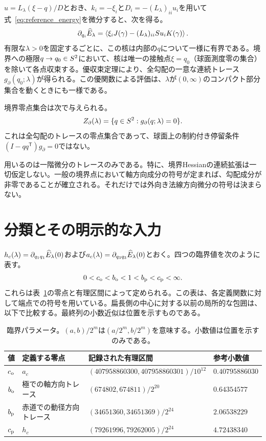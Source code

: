 $u=L_\lambda(\xi-q)/D$とおき、$k_i=-\xi_i$と$D_i=-(L_\lambda)_{ii}u_i$を用いて式~\eqref{eq:reference_energy}を微分すると、次を得る。
\begin{equation}\label{eq:gradient}
 \partial_{q_i}\widehat E_\lambda
 =\left\langle \xi_iJ(\gamma)-(L_\lambda)_{ii}S u_iK(\gamma)\right\rangle.
\end{equation}
有限な$\lambda>0$を固定するごとに、この核は内部の$q$について一様に有界である。境界への極限$q\to q_0\in S^2$において、核は唯一の接触点$\xi=q_0$（球面測度零の集合）を除いて各点収束する。優収束定理により、全勾配の一意な連続トレース$g_\partial(q_0;\lambda)$が得られる。この優関数による評価は、$\lambda$が$(0,\infty)$のコンパクト部分集合を動くときにも一様である。

\begin{definition}[境界零点の規約]\label{def:boundary}
境界零点集合は次で与えられる。
\begin{equation}\label{eq:boundary}
 Z_\partial(\lambda)=\{q\in S^2:g_\partial(q;\lambda)=0\}.
\end{equation}
これは全勾配のトレースの零点集合であって、球面上の制約付き停留条件$(I-qq^{\mathsf T})g_\partial=0$ではない。
\end{definition}

用いるのは一階微分のトレースのみである。特に、境界Hessianの連続拡張は一切仮定しない。一般の境界点において軸方向成分の符号が定まれば、勾配成分が非零であることが確立される。それだけでは外向き法線方向微分の符号は決まらない。

\section{分類とその明示的な入力}\label{sec:classification}

$h_c(\lambda)=\partial_{q_1q_1}\widehat E_\lambda(0)$および$a_c(\lambda)=\partial_{q_3q_3}\widehat E_\lambda(0)$とおく。四つの臨界値を次のように表す。
\[
 0<c_{\mathrm o}<b_{\mathrm o}<1<b_{\mathrm p}<c_{\mathrm p}<\infty.
\]
これらは表~\ref{tab:critical}の零点と有理区間によって定められる。この表は、各定義関数に対して端点での符号を用いている。扁長側の中心に対する以前の局所的な包囲は、以下で比較する。最終列の小数近似は位置を示すものである。

\begin{table}[htbp]\centering\small
\caption{臨界パラメータ。$(a,b)/2^m$は$(a/2^m,b/2^m)$を意味する。小数値は位置を示すのみである。}\label{tab:critical}
\begin{tabular}{@{}llll@{}}\toprule
値 & 定義する零点 & 記録された有理区間 & 参考小数値\\\midrule
$c_{\mathrm o}$ & $a_c$ & $(407958860300,407958860301)/10^{12}$ & $0.40795886030$\\
$b_{\mathrm o}$ & 極での軸方向トレース & $(674802,674811)/2^{20}$ & $0.64354577$\\
$b_{\mathrm p}$ & 赤道での動径方向トレース & $(34651360,34651369)/2^{24}$ & $2.06538229$\\
$c_{\mathrm p}$ & $h_c$ & $(79261996,79262005)/2^{24}$ & $4.72438340$\\\bottomrule
\end{tabular}
\end{table}

